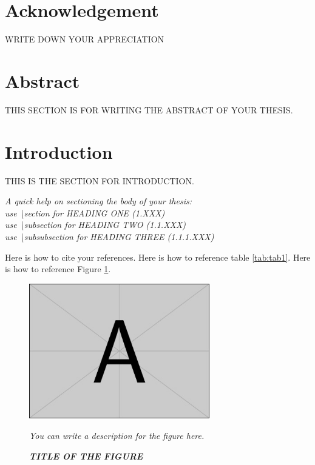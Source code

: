 \documentclass[a4paper, 12pt]{article}
\begin{document}


\section*{Acknowledgement}
\noindent WRITE DOWN YOUR APPRECIATION
\thispagestyle{empty} %
\clearpage

\section*{Abstract}
THIS SECTION IS FOR WRITING THE ABSTRACT OF YOUR THESIS.

\clearpage
\tableofcontents
\listoffigures
\listoftables
\clearpage

\pagestyle{fancy}

\section{Introduction}
THIS IS THE SECTION FOR INTRODUCTION.\cite{knuth1984texbook}

\textit{\noindent A quick help on sectioning the body of your thesis: \\
use \textbackslash section for HEADING ONE (1.XXX)\\
use \textbackslash subsection for HEADING TWO (1.1.XXX)\\
use \textbackslash subsubsection for HEADING THREE (1.1.1.XXX)}

Here is how to cite your references.\cite{lamport1986latex}
Here is how to reference table \ref{tab:tab1}.
Here is how to reference Figure \ref{fig:fig1}.

\begin{figure}[H]
  \centering
  \includegraphics[width=0.7\textwidth]{example-image-a.jpg}
  \caption{\small \textbf{\textit{TITLE OF THE FIGURE}}}
  \footnotesize \textit{You can write a description for the figure here.\cite{website2023example}}
  \label{fig:fig1}
\end{figure}
\end{document}
